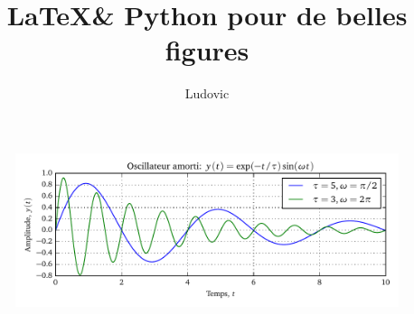 \documentclass[10pt,a4paper,twoside]{article}
\author{Ludovic}
\title{\LaTeX \& Python pour de belles figures}
\begin{document}
\maketitle

\lipsum[1-4]
\begin{figure}[htb]
\begin{center}
\includegraphics{oscillateur}
\end{center}
\end{figure}
\lipsum[1-4]

\lipsum[1-8]
\end{document}
